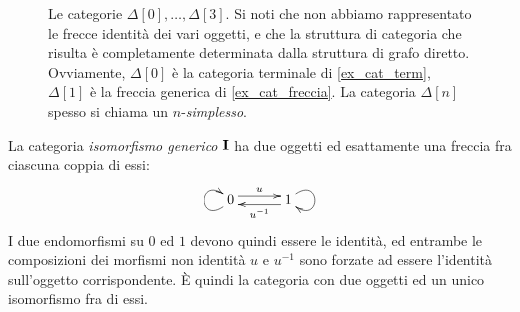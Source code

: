 \begin{example}
\begin{figure}[h]
\begin{center}
		\end{center}
		\caption{Le categorie \(\Delta[0], \dots,\Delta[3]\). Si noti che non abbiamo rappresentato le frecce identità dei vari oggetti, e che la struttura di categoria che risulta è completamente determinata dalla struttura di grafo diretto. Ovviamente, \(\Delta[0]\) è la categoria terminale di \ref{ex_cat_term}, \(\Delta[1]\) è la freccia generica di \ref{ex_cat_freccia}. La categoria \(\Delta[n]\) spesso si chiama un \(n\)-\emph{simplesso}. }
		\label{fig:le_delta}
	\end{figure}
\end{example}
\begin{example}\label{ex_cat_iso}
	La categoria \emph{isomorfismo generico} \(\mathbf{I}\) ha due oggetti ed esattamente una freccia fra ciascuna coppia di essi:
	\[\xymatrix@C=7ex{0 \ar@<.7ex>[r]^u \ar@(dl,ul)[] & 1 \ar@<.7ex>[l]^{u^{-1}} \ar@(ur,dr)[]}\]
	I due endomorfismi su \(0\) ed \(1\) devono quindi essere le identità, ed entrambe le composizioni dei morfismi non identità \(u\) e \(u^{-1}\) sono forzate ad essere l'identità sull'oggetto corrispondente. \`E quindi la categoria con due oggetti ed un unico isomorfismo fra di essi.
\end{example}
